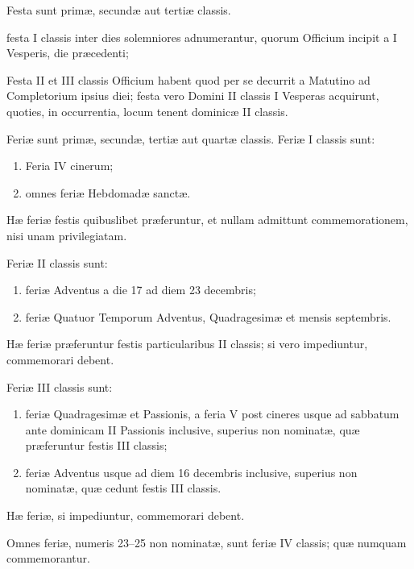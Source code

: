 \documentclass[vesperale_romanum.tex]{subfiles}
\begin{document}

Festa sunt primæ, secundæ aut tertiæ classis.

festa I classis inter dies solemniores adnumerantur, quorum Officium incipit a I Vesperis, die præcedenti;

Festa II et III classis Officium habent quod per se decurrit a Matutino ad Completorium ipsius diei; festa vero Domini II classis I Vesperas acquirunt, quoties, in occurrentia, locum tenent dominicæ II classis.


Feriæ sunt primæ, secundæ, tertiæ aut quartæ classis. Feriæ I classis sunt:

\begin{enumerate}[nosep,label=\alph*.]
\item 
Feria IV cinerum;
\item omnes feriæ Hebdomadæ sanctæ.
\end{enumerate}

Hæ feriæ festis quibuslibet præferuntur, et nullam admittunt commemorationem, nisi unam privilegiatam.

Feriæ II classis sunt:
\begin{enumerate}[nosep,label=\alph*.]

\item feriæ Adventus a die 17 ad diem 23 decembris;
\item feriæ Quatuor Temporum Adventus, Quadragesimæ et mensis septembris.
\end{enumerate}

Hæ feriæ præferuntur festis particularibus II classis; si vero impediuntur, commemorari debent.

Feriæ III classis sunt:
\begin{enumerate}[nosep,label=\alph*.]
\item feriæ Quadragesimæ et Passionis, a feria V post cineres usque ad sabbatum ante dominicam II Passionis inclusive, superius non nominatæ, quæ præferuntur festis III classis;

\item feriæ Adventus usque ad diem 16 decembris inclusive, superius non nominatæ, quæ cedunt festis III classis.
\end{enumerate}

Hæ feriæ, si impediuntur, commemorari debent.

Omnes feriæ, numeris 23–25 non nominatæ, sunt feriæ IV classis; quæ numquam commemorantur. %
\end{document}
